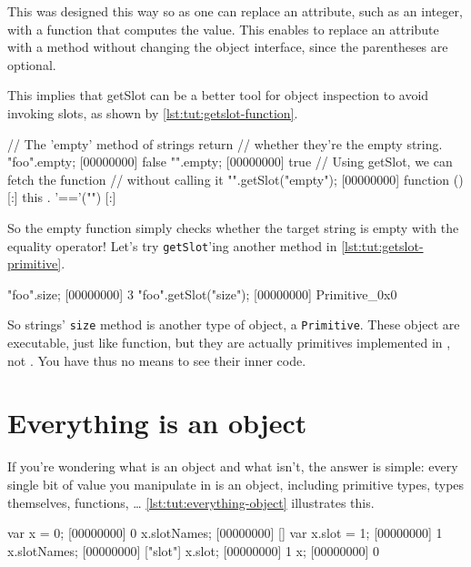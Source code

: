 This was designed this way so as one can replace an attribute, such as
an integer, with a function that computes the value. This enables to
replace an attribute with a method without changing the object
interface, since the parentheses are optional.

This implies that getSlot can be a better tool for object inspection
to avoid invoking slots, as shown by \autoref{lst:tut:getslot-function}.

\begin{urbiscript}[caption=Inspecting executable slots with \lstinline{getSlot},
label=lst:tut:getslot-function]
// The 'empty' method of strings return
// whether they're the empty string.
"foo".empty;
[00000000] false
"".empty;
[00000000] true
// Using getSlot, we can fetch the function
// without calling it
"".getSlot("empty");
[00000000] function () {
[:]  this . '=='("")
[:]}
\end{urbiscript}

So the empty function simply checks whether the target string is empty
with the equality operator! Let's try \lstinline{getSlot}'ing another method in
\autoref{lst:tut:getslot-primitive}.

\begin{urbiscript}[caption=Primitives, label=lst:tut:getslot-primitive]
"foo".size;
[00000000] 3
"foo".getSlot("size");
[00000000] Primitive_0x0
\end{urbiscript}

So strings' \lstinline{size} method is another type of object, a
\lstinline{Primitive}. These object are executable, just like function,
but they are actually primitives implemented in \Cxx, not \us. You
have thus no means to see their inner code.

\section{Everything is an object}

If you're wondering what is an object and what isn't, the answer is
simple: every single bit of value you manipulate in \us is an
object, including primitive types, types themselves, functions, \ldots
\autoref{lst:tut:everything-object} illustrates this.

\begin{urbiscript}[caption=Everything is an object,
label=lst:tut:everything-object]
var x = 0;
[00000000] 0
x.slotNames;
[00000000] []
var x.slot = 1;
[00000000] 1
x.slotNames;
[00000000] ["slot"]
x.slot;
[00000000] 1
x;
[00000000] 0
\end{urbiscript}

